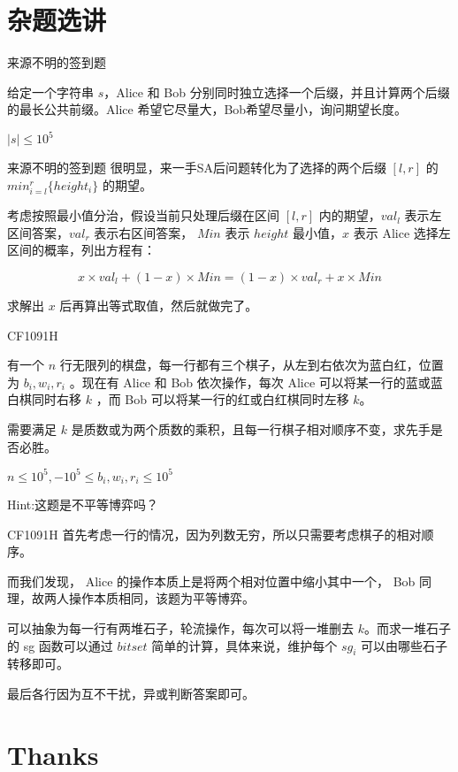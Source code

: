 \documentclass[9pt]{beamer}
\begin{document}
  \section{杂题选讲}

  \begin{frame}{来源不明的签到题}
    \par 给定一个字符串 $s$，Alice 和 Bob 分别同时独立选择一个后缀，并且计算两个后缀的最长公共前缀。Alice 希望它尽量大，Bob希望尽量小，询问期望长度。
    \par $|s| \leq 10^5$
  \end{frame}
 
  \begin{frame}{来源不明的签到题}
     很明显，来一手SA后问题转化为了选择的两个后缀 $[l,r]$ 的 $min_{i=l}^r\{height_i\}$ 的期望。

     考虑按照最小值分治，假设当前只处理后缀在区间 $[l,r]$ 内的期望，$val_l$ 表示左区间答案，$val_r$ 表示右区间答案， $Min$ 表示 $height$ 最小值，$x$ 表示 Alice 选择左区间的概率，列出方程有：

     $$ x\times val_l + (1-x) \times Min = (1-x) \times val_r + x \times Min$$

     求解出 $x$ 后再算出等式取值，然后就做完了。
  \end{frame}
  
  \begin{frame}{CF1091H}
    \par 有一个 $n$ 行无限列的棋盘，每一行都有三个棋子，从左到右依次为蓝白红，位置为 $b_i,w_i,r_i$ 。现在有 Alice 和 Bob 依次操作，每次 Alice 可以将某一行的蓝或蓝白棋同时右移 $k$ ，而 Bob 可以将某一行的红或白红棋同时左移 $k$。
    \par 需要满足 $k$ 是质数或为两个质数的乘积，且每一行棋子相对顺序不变，求先手是否必胜。
    \par $n \le 10^5, -10^5\leq b_i,w_i,r_i\leq 10^5$

     Hint:这题是不平等博弈吗？
  \end{frame}
  
  \begin{frame}{CF1091H}
     首先考虑一行的情况，因为列数无穷，所以只需要考虑棋子的相对顺序。

     而我们发现， Alice 的操作本质上是将两个相对位置中缩小其中一个， Bob 同理，故两人操作本质相同，该题为平等博弈。

     可以抽象为每一行有两堆石子，轮流操作，每次可以将一堆删去 $k$。而求一堆石子的 sg 函数可以通过 $bitset$ 简单的计算，具体来说，维护每个 $sg_i$ 可以由哪些石子转移即可。

     最后各行因为互不干扰，异或判断答案即可。
  \end{frame}

  \section{Thanks}
\end{document}
